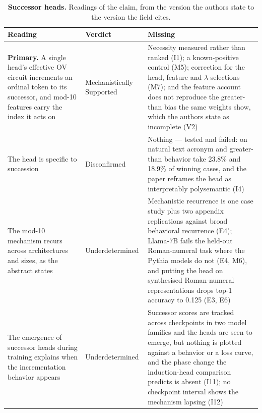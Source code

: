 \clearpage
\begin{table}[H]
\centering
\footnotesize
\caption{\textbf{Successor heads.} Readings of the claim, from the version the authors state to the version the
field cites.}
\label{tab:successor_heads-readings}
\renewcommand{\arraystretch}{1.18}
\begin{tabular}{@{}>{\raggedright\arraybackslash}p{3.3cm}l>{\raggedright\arraybackslash}p{4.4cm}@{}}
\toprule
\textbf{Reading} & \textbf{Verdict} & \textbf{Missing} \\
\midrule
\textbf{Primary.} A single head's effective OV circuit increments an ordinal token to its successor, and mod-10 features carry the index it acts on
  & Mechanistically Supported
  & Necessity measured rather than ranked (I1); a known-positive control (M5); correction for the head, feature and $\lambda$ selections (M7); and the feature account does not reproduce the greater-than bias the same weights show, which the authors state as incomplete (V2) \\
\addlinespace[2pt]
The head is specific to succession
  & Disconfirmed
  & Nothing --- tested and failed: on natural text acronym and greater-than behavior take 23.8\% and 18.9\% of winning cases, and the paper reframes the head as interpretably polysemantic (I4) \\
\addlinespace[2pt]
The mod-10 mechanism recurs across architectures and sizes, as the abstract states
  & Underdetermined
  & Mechanistic recurrence is one case study plus two appendix replications against broad behavioral recurrence (E4); Llama-7B fails the held-out Roman-numeral task where the Pythia models do not (E4, M6), and putting the head on synthesised Roman-numeral representations drops top-1 accuracy to 0.125 (E3, E6) \\
\addlinespace[2pt]
The emergence of successor heads during training explains when the incrementation behavior appears
  & Underdetermined
  & Successor scores are tracked across checkpoints in two model families and the heads are seen to emerge, but nothing is plotted against a behavior or a loss curve, and the phase change the induction-head comparison predicts is absent (I11); no checkpoint interval shows the mechanism lapsing (I12) \\
\bottomrule
\end{tabular}
\end{table}

